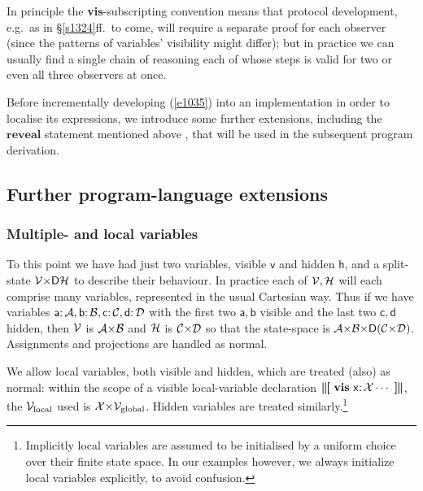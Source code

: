 \documentclass[runningheads]{llncs}
\newcommand\Vh {\mathsf{h}}
\newcommand\Vv {\mathsf{v}}
\newcommand\Va {\mathsf{a}}
\newcommand\Vb {\mathsf{b}}
\newcommand\Vc {\mathsf{c}}
\newcommand\Vd {\mathsf{d}}
\newcommand\Vx {\mathsf{x}}
\newcommand\Sec[1] {Sec.~\ref{#1}}
\renewcommand\Sec[1] {\S\ref{#1}}
\newcommand\Eqn[1] {(\ref{#1})}
\newcommand\VV {{\cal V}}
\newcommand\HH {{\cal H}}
\newcommand\TDist {\mathsf{D}}
\newcommand\In {{:}\,}
\newcommand\Reveal {\textbf{reveal}}
\newcommand\Vis {\textbf{vis}}
\newcommand{\Begin}{\mbox{\boldmath\textbf{$\parallel\kern-.365em[$}}}
\newcommand{\End}{\mbox{\boldmath\textbf{$]\kern-.365em\parallel$}}}
\begin{document}
In principle the \Vis-subscripting convention means that protocol development, e.g.\ as in \Sec{s1324}ff.\ to come, will require a separate proof for each observer (since the patterns of variables' visibility might differ); but in practice we can usually find a single chain of reasoning each of whose steps is valid for two or even all three observers at once.

Before incrementally developing \Eqn{e1035} into an implementation in order to localise its expressions, we introduce some further extensions, including the $\Reveal$ statement mentioned above \cite{McIver:08a}, that will be used in the subsequent program derivation.

\subsection{Further program-language extensions} \label{s9374}
\subsubsection{Multiple- and local variables}
To this point we have had just two variables, visible $\Vv$ and hidden $\Vh$, and a split-state $\VV{\times}\TDist\HH$ to describe their behaviour. In practice each of $\VV,\HH$ will each comprise many variables, represented in the usual Cartesian way. Thus if we have variables $\Va\In{\cal A},\Vb\In{\cal B},\Vc\In{\cal C},\Vd\In{\cal D}$ with the first two $\Va,\Vb$ visible and the last two $\Vc,\Vd$ hidden, then $\VV$ is ${\cal A}{\times}{\cal B}$ and $\HH$ is ${\cal C}{\times}{\cal D}$ so that the state-space is ${\cal A}{\times}{\cal B}{\times}\TDist({\cal C}{\times}{\cal D})$. Assignments and projections are handled as normal.

We allow local variables, both visible and hidden, which are treated (also) as normal: within the scope of a visible local-variable declaration $\Begin~\Vis~\Vx\In{\cal X}\cdots~\End$, the $\VV_{\rm local}$ used is ${\cal X}{\times}\VV_{\rm global}$. Hidden variables are treated similarly.\footnote{Implicitly local variables are assumed to be initialised by a uniform choice over their finite state space. In our examples however, we always initialize local variables explicitly, to avoid confusion.}
\end{document}
